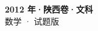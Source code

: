 \documentclass[zihao=-4, a4paper]{ctexart}
\begin{document}
\begin{center}
  {\Large\bfseries 2012 年·陕西卷·文科}\\[4pt]
  {\large 数学 · 试题版}
\end{center}
\medskip
{}

\end{document}
